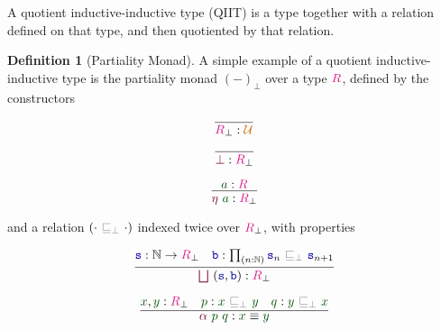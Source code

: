 \documentclass[twoside,11pt,openright]{report}
\theoremstyle{plain} %
\theoremstyle{definition}
\newtheorem{defn}{Definition}[section]
\theoremstyle{remark}
\newcommand*{\term}[1]{\textcolor{green!30!black}{#1}} %
\newcommand*{\type}[1]{\textcolor{magenta!90!black}{#1}}
\newcommand*{\universe}[1]{\textcolor{orange!80!black}{#1}}
\newcommand*{\relation}[1]{\textcolor{gray}{\ensuremath{\mathtt{#1}}}}
\newcommand*{\function}[1]{\textcolor{blue!60!black}{\ensuremath{\mathtt{#1}}}}
\newcommand*{\constructor}[1]{\textcolor{purple!60!black}{\ensuremath{\mathtt{#1}}}}
\begin{document}
A quotient inductive-inductive type (QIIT) is a type together with a relation defined on that type, and then quotiented by that relation.
\begin{defn}[Partiality Monad]
  A simple example of a quotient inductive-inductive type is the partiality monad \((-)_\bot\) over a type \(\type{R}\), defined by the constructors\\[-9mm]
  \begin{center}
    \begin{minipage}{0.25\linewidth}
      \begin{equation}
        \infer{\type{R}_\bot : \universe{\mathcal{U}}}{}
      \end{equation}
    \end{minipage}
    \hfill
    \begin{minipage}{0.25\linewidth}
      \begin{equation}
        \infer{\constructor{\bot} : \type{R}_\bot}{}
      \end{equation}
    \end{minipage}
    \hfill
    \begin{minipage}{0.25\linewidth}
      \begin{equation}
        \infer{\constructor{\eta}~\term{a} : \type{R}_\bot}{\term{a} : \type{R}}
      \end{equation}
    \end{minipage}
  \end{center}
  and a relation \((\cdot~\relation{\sqsubseteq_{\bot}}~\cdot)\) indexed twice over \(\type{R}_\bot\), with properties\\[-9mm] 
  \begin{center}
    \begin{minipage}{0.45\linewidth}
      \begin{equation}
        \infer{\constructor{\bigsqcup}~(\function{s},\function{b}) : \type{R}_\bot}{\function{s} : \mathbb{N} \rightarrow \type{R}_\bot & \function{b} : \prod_{(n : \mathbb{N})} \function{s}_n~\relation{\sqsubseteq_{\bot}}~\function{s}_{n+1} }
      \end{equation}
    \end{minipage}
    \hfill
    \begin{minipage}{0.45\linewidth}
      \begin{equation}
        \infer{\constructor{\alpha}~\term{p}~\term{q} : \term{x} \equiv \term{y}}{\term{x},\term{y} : \type{R}_\bot & \term{p} : \term{x}~\relation{\sqsubseteq_{\bot}}~\term{y} & \term{q} : \term{y}~\relation{\sqsubseteq_{\bot}}~\term{x}}

\end{equation}
\end{minipage}
\end{center}
\end{defn}
\end{document}

